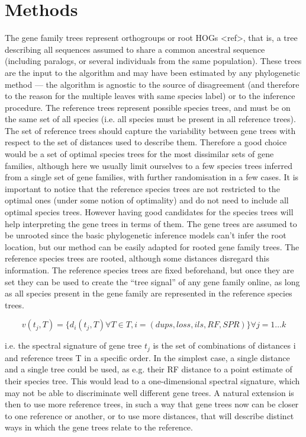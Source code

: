 \section{Methods}
The gene family trees represent orthogroups or root HOGs <ref>, that is, a tree describing all sequences assumed to
share a common ancestral sequence (including paralogs, or several individuals from the same population). These trees are
the input to the algorithm and may have been estimated by any phylogenetic method --- the algorithm is agnostic to the
source of disagreement (and therefore to the reason for the multiple leaves with same species label) or to the inference
procedure. The reference trees represent possible species trees, and must be on the same set of all species (i.e. all
species must be present in all reference trees). The set of reference trees should capture the variability between gene
trees with respect to the set of distances used to describe them. Therefore a good choice would be a set of optimal
species trees for the most dissimilar sets of gene families, although here we usually limit ourselves to a few species
trees inferred from a single set of gene families, with further randomisation in a few cases. It is important to notice
that the reference species trees are not restricted to the optimal ones (under some notion of optimality) and do not
need to include all optimal species trees. However having good candidates for the species trees will help interpreting
the gene trees in terms of them. The gene trees are assumed to be unrooted since the basic phylogenetic inference models
can’t infer the root location, but our method can be easily adapted for rooted gene family trees. The reference species
trees are rooted, although some distances disregard this information. The reference species trees are fixed beforehand,
but once they are set they can be used to create the “tree signal” of any gene family online, as long as all species
present in the gene family are represented in the reference species trees.

\begin{equation}
v(t_j,T) = \{d_i(t_j, T) \forall T \in T, i=\left(dups, loss, ils, RF, SPR\right) \} \forall j=1\dots k
\end{equation}


i.e. the spectral signature of gene tree $t_j$ is the set of combinations of distances i and reference trees T in a
specific order. In the simplest case, a single distance and a single tree could be used, as e.g. their RF distance to a
point estimate of their species tree. This would lead to a one-dimensional spectral signature, which may not be able to
discriminate well different gene trees. A natural extension is then to use more reference trees, in such a way that gene
trees now can be closer to one reference or another, or to use more distances, that will describe distinct ways in which
the gene trees relate to the reference.

